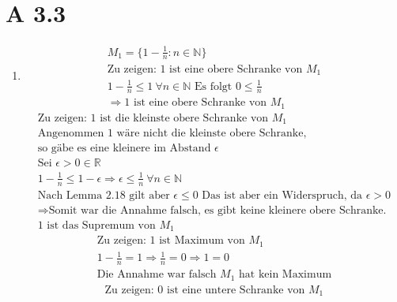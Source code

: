 \documentclass{article}
\begin{document}
    \section*{A 3.3}
        \begin{enumerate}[label = (\alph*)]
            \item 
                \begin{gather*}
                    M_1 = \{1- \frac{1}{n}: n \in \mathbb{N} \} \\
                    \text{Zu zeigen: 1 ist eine obere Schranke von } M_1 \\
                    1 - \frac{1}{n} \leq 1 \: \forall n \in \mathbb{N} \text{ Es folgt } 0 \leq \frac{1}{n} \\
                    \Rightarrow \text{1 ist eine obere Schranke von } M_1
                \end{gather*} 
                \begin{gather*}
                    \text{Zu zeigen: 1 ist die kleinste obere Schranke von } M_1 \\
                    \text{Angenommen 1 wäre nicht die kleinste obere Schranke,} \\
                    \text{so gäbe es eine kleinere im Abstand } \epsilon \\
                    \text{Sei } \epsilon > 0 \in \mathbb{R} \\
                    1 - \frac{1}{n} \leq 1 - \epsilon \Rightarrow \epsilon \leq \frac{1}{n} \: \forall n \in \mathbb{N} \\
                    \text{Nach Lemma 2.18 gilt aber } \epsilon \leq 0 \text{ Das ist aber ein Widerspruch, da } \epsilon > 0 \\
                    \Rightarrow \text{Somit war die Annahme falsch, es gibt keine kleinere obere Schranke.} \\
                    \text{1 ist das Supremum von } M_1
                \end{gather*}
                \begin{gather*}
                    \text{Zu zeigen: 1 ist Maximum von } M_1 \\
                    1-\frac{1}{n} = 1 \Rightarrow \frac{1}{n} = 0 \Rightarrow 1 = 0 \\
                    \text{Die Annahme war falsch } M_1 \text{ hat kein Maximum}
                \end{gather*}
                \begin{gather*}
                    \text{Zu zeigen: 0 ist eine untere Schranke von } M_1 \\

\end{gather*}
\end{enumerate}
\end{document}
